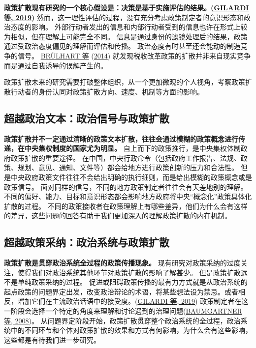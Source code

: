 \documentclass[
  12pt,
]{ctexart}
\begin{document}
\textbf{政策扩散现有研究的一个核心假设是：决策是基于实施评估的结果。(\protect\hyperlink{ref-GilardiWasserfallen2019}{GILARDI 等, 2019})}
然而，这一理性评估的过程，没有充分考虑政策制定者的意识形态和政治态度的影响。
外部行动者发出的信息和内部行动者受到的信息也许在形式上较为相似，但在理解上可能完全不同。
信息是通过身份的滤镜处理后的结果，政策通过受政治态度偏见的理解而评估和传播。
政治态度有时甚至还会能动的制造竞争的信号。 \protect\hyperlink{ref-BrulhartParchet2014}{BRÜLHART 等} (\protect\hyperlink{ref-BrulhartParchet2014}{2014}) 就发现税收改革政策的扩散并非来自现实竞争而是通过自我诱导的误解产生的。

政策扩散未来的研究需要打破整体组织，从一个更加微观的个人视角，考察政策扩散行动者的身份认同对政策扩散方向、速度、机制等方面的影响。

\hypertarget{ux8d85ux8d8aux653fux6cbbux6587ux672cux653fux6cbbux4fe1ux53f7ux4e0eux653fux7b56ux6269ux6563}{%
\subsection{超越政治文本：政治信号与政策扩散}\label{ux8d85ux8d8aux653fux6cbbux6587ux672cux653fux6cbbux4fe1ux53f7ux4e0eux653fux7b56ux6269ux6563}}

\textbf{政策扩散并不一定通过清晰的政策文本扩散，往往会通过模糊的政策概念进行传递，在中央集权制度的国家尤为明显。}
自上而下的政策推行，是中央集权体制政府政策扩散的重要途径。
在中国，中央行政命令（包括政府工作报告、法规、政策、规划、意见、通知、文件等）都会给地方进行政策创新的压力和合法性。
但是中央政府政策文件往往不会给出明确的执行细则，而是给出模糊的政策概念或是政策信号。
面对同样的信号，不同的地方政策制定者往往会有天差地别的理解。
不同的偏好、能力、目标和意识形态都会影响地方政府将中央``概念化''政策具体化扩散的过程。
不同的政策接收者在政策理解上有哪些差异，他们为什么会有这样的差异，这些问题的回答有助于我们更加深入的理解政策扩散的内在机制。

\hypertarget{ux8d85ux8d8aux653fux7b56ux91c7ux7eb3ux653fux6cbbux7cfbux7edfux4e0eux653fux7b56ux6269ux6563}{%
\subsection{超越政策采纳：政治系统与政策扩散}\label{ux8d85ux8d8aux653fux7b56ux91c7ux7eb3ux653fux6cbbux7cfbux7edfux4e0eux653fux7b56ux6269ux6563}}

\textbf{政策扩散是贯穿政治系统全过程的政策传播现象。}
现有研究对政策采纳的过度关注，使得我们对政治系统其他环节对政策扩散的影响了解甚少。
但是政策扩散远不是单纯政策采纳的过程。
促进或阻碍政策传播的最有力方式就是从政治系统的起点政策的问题界定出发，改变政治辩论的术语，将某些想法设为禁忌。或者相反，增加它们在主流政治话语中的接受度。(\protect\hyperlink{ref-GilardiWasserfallen2019}{GILARDI 等, 2019})
政策制定者在这一阶段会选择一个特定的角度来理解和讨论遇到的治理问题(\protect\hyperlink{ref-BaumgartnerEtAl2008}{BAUMGARTNER 等, 2008})。
从问题界定阶段开始，政策扩散贯穿整个政治系统的全过程，政治系统中的不同环节和个体对政策扩散的效果和方式有何影响，为什么会有这些影响，这些都是有待我们进一步研究。
\end{document}
